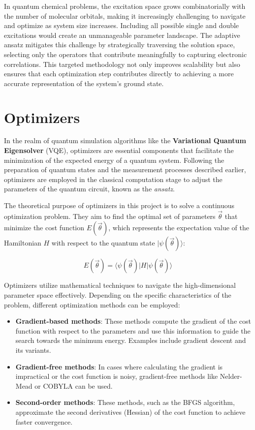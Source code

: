 In quantum chemical problems, the excitation space grows combinatorially with the number of molecular orbitals, making it increasingly challenging to navigate and optimize as system size increases. Including all possible single and double excitations would create an unmanageable parameter landscape. The adaptive ansatz mitigates this challenge by strategically traversing the solution space, selecting only the operators that contribute meaningfully to capturing electronic correlations. This targeted methodology not only improves scalability but also ensures that each optimization step contributes directly to achieving a more accurate representation of the system’s ground state.

\section{Optimizers}

In the realm of quantum simulation algorithms like the \textbf{Variational Quantum Eigensolver} (VQE), optimizers are essential components that facilitate the minimization of the expected energy of a quantum system. Following the preparation of quantum states and the measurement processes described earlier, optimizers are employed in the classical computation stage to adjust the parameters of the quantum circuit, known as the \textit{ansatz}.

The theoretical purpose of optimizers in this project is to solve a continuous optimization problem. They aim to find the optimal set of parameters \(\vec{\theta}\) that minimize the cost function \(E(\vec{\theta})\), which represents the expectation value of the Hamiltonian \(H\) with respect to the quantum state \(| \psi(\vec{\theta}) \rangle\):

\[
E(\vec{\theta}) = \langle \psi(\vec{\theta}) | H | \psi(\vec{\theta}) \rangle
\]

Optimizers utilize mathematical techniques to navigate the high-dimensional parameter space effectively. Depending on the specific characteristics of the problem, different optimization methods can be employed:

\begin{itemize}
    \item \textbf{Gradient-based methods}: These methods compute the gradient of the cost function with respect to the parameters and use this information to guide the search towards the minimum energy. Examples include gradient descent and its variants.
    \item \textbf{Gradient-free methods}: In cases where calculating the gradient is impractical or the cost function is noisy, gradient-free methods like Nelder-Mead or COBYLA can be used.
    \item \textbf{Second-order methods}: These methods, such as the BFGS algorithm, approximate the second derivatives (Hessian) of the cost function to achieve faster convergence.
\end{itemize}

